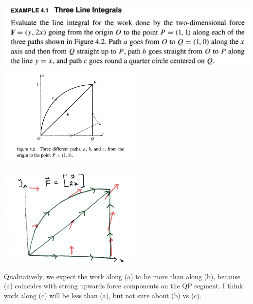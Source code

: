 \begin{mdframed}
  \includegraphics[width=400pt]{img/physics--classical-mechanics--taylor--ex-4-1.png}\\
  \includegraphics[width=200pt]{img/physics--classical-mechanics--taylor--ex-4-1-diag.png}
\end{mdframed}
\begin{mdframed}
  \includegraphics[width=200pt]{img/physics--classical-mechanics--taylor--ex-4-1-diag-2.png}
\end{mdframed}
Qualitatively, we expect the work along (a) to be more than along (b), because (a) coincides with
strong upwards force components on the QP segment. I think work along (c) will be less than (a), but
not sure about (b) vs (c).

